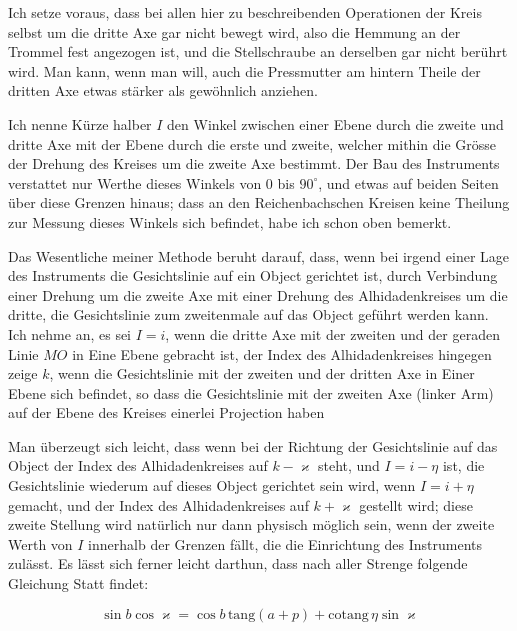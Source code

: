 \par\indent Ich setze voraus, dass bei allen hier zu beschreibenden Operationen der Kreis selbst um die dritte Axe gar nicht bewegt wird, also die Hemmung an der Trommel fest angezogen ist, und die Stellschraube an derselben gar nicht berührt wird. Man kann, wenn man will, auch die Pressmutter am hintern Theile der dritten Axe etwas stärker als gewöhnlich anziehen.

\par\indent Ich nenne Kürze halber $I$ den Winkel zwischen einer Ebene durch die zweite und dritte Axe mit der Ebene durch die erste und zweite, welcher mithin die Grösse der Drehung des Kreises um die zweite Axe bestimmt. Der Bau des Instruments verstattet nur Werthe dieses Winkels von $0$ bis $90^\circ$, und etwas auf beiden Seiten über diese Grenzen hinaus; dass an den Reichenbachschen Kreisen keine Theilung zur Messung dieses Winkels sich befindet, habe ich schon oben bemerkt.

\par\indent Das Wesentliche meiner Methode beruht darauf, dass, wenn bei irgend einer Lage des Instruments die Gesichtslinie auf ein Object gerichtet ist, durch Verbindung einer Drehung um die zweite Axe mit einer Drehung des Alhidadenkreises um die dritte, die Gesichtslinie zum zweitenmale auf das Object geführt werden kann. Ich nehme an, es sei $I = i$, wenn die dritte Axe mit der zweiten und der geraden Linie $MO$ in Eine Ebene gebracht ist, der Index des Alhidadenkreises hingegen zeige $k$, wenn die Gesichtslinie mit der zweiten und der dritten Axe in Einer Ebene sich befindet, so dass die Gesichtslinie mit der zweiten Axe (linker Arm) auf der Ebene des Kreises einerlei Projection haben

\par\indent Man überzeugt sich leicht, dass wenn bei der Richtung der Gesichtslinie auf das Object der Index des Alhidadenkreises auf $k-\varkappa$ steht, und $I=i-\eta$ ist, die Gesichtslinie wiederum auf dieses Object gerichtet sein wird, wenn $I=i+\eta$ gemacht, und der Index des Alhidadenkreises auf $k+\varkappa$ gestellt wird; diese zweite Stellung wird natürlich nur dann physisch möglich sein, wenn der zweite Werth von $I$ innerhalb der Grenzen fällt, die die Einrichtung des Instruments zulässt. Es lässt sich ferner leicht darthun, dass nach aller Strenge folgende Gleichung Statt findet:

\[ \sin b \cos\varkappa = \cos b\, \mathrm{tang}(a+p) + \mathrm{cotang}\,\eta \sin\varkappa \]

